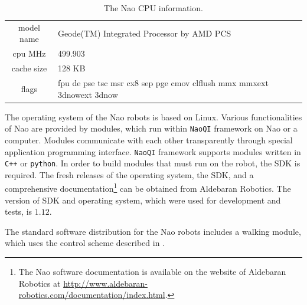 \begin{table}
\begin{center}
\begin{tabular}{c|p{7cm}}
model name & Geode(TM) Integrated Processor by AMD PCS\\
cpu MHz    & 499.903\\
cache size & 128 KB\\
flags      & fpu de pse tsc msr cx8 sep pge cmov clflush
             mmx mmxext 3dnowext 3dnow\\
\end{tabular}
\caption[The Nao CPU information]{The Nao CPU information.}
\label{tbl.cpu}
\end{center}
\end{table}

The operating system of the Nao robots is based on Linux. Various functionalities 
of Nao are provided by modules, which run within \verb|NaoQI| framework on Nao or 
a computer. Modules communicate with each other transparently through special 
application programming interface. \verb|NaoQI| framework supports modules written 
in \verb|C++| or \verb|python|. In order to build modules that must run on the
robot, the \ac{SDK} is required. The fresh releases of the operating system, the 
\ac{SDK}, and a comprehensive documentation\footnote{The Nao software documentation 
is available on the website of Aldebaran Robotics at
\url{http://www.aldebaran-robotics.com/documentation/index.html}.}
can be obtained from Aldebaran Robotics. The version of \ac{SDK} and operating system, 
which were used for development and tests, is $1.12$.

The standard software distribution for the Nao robots includes a walking module,
which uses the control scheme described in \cite{NaoWalk}.
